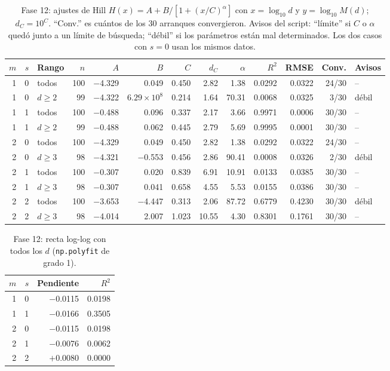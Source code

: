\documentclass[11pt,letterpaper]{article}
\begin{document}
\begin{table}[H]
\centering
\footnotesize
\setlength{\tabcolsep}{3.5pt}
\caption{Fase 12: ajustes de Hill $H(x)=A+B/[1+(x/C)^\alpha]$ con $x=\log_{10}d$ y $y=\log_{10}M(d)$; $d_C=10^C$. ``Conv.'' es cuántos de los 30 arranques convergieron. Avisos del script: ``límite'' si $C$ o $\alpha$ quedó junto a un límite de búsqueda; ``débil'' si los parámetros están mal determinados. Los dos casos con $s=0$ usan los mismos datos.}\label{tab:f12hill}
\begin{adjustbox}{max width=\textwidth}
\begin{tabular}{rrlrrrrrrrrrl}
\toprule
$m$ & $s$ & Rango & $n$ & $A$ & $B$ & $C$ & $d_C$ & $\alpha$ & $R^2$ & RMSE & Conv. & Avisos \\
\midrule
1 & 0 & todos & 100 & $-$4.329 & 0.049 & 0.450 & 2.82 & 1.38 & 0.0292 & 0.0322 & 24/30 & -- \\
1 & 0 & $d\ge2$ & 99 & $-$4.322 & $6.29\times10^{8}$ & 0.214 & 1.64 & 70.31 & 0.0068 & 0.0325 & 3/30 & débil \\
1 & 1 & todos & 100 & $-$0.488 & 0.096 & 0.337 & 2.17 & 3.66 & 0.9971 & 0.0006 & 30/30 & -- \\
1 & 1 & $d\ge2$ & 99 & $-$0.488 & 0.062 & 0.445 & 2.79 & 5.69 & 0.9995 & 0.0001 & 30/30 & -- \\
2 & 0 & todos & 100 & $-$4.329 & 0.049 & 0.450 & 2.82 & 1.38 & 0.0292 & 0.0322 & 24/30 & -- \\
2 & 0 & $d\ge3$ & 98 & $-$4.321 & $-$0.553 & 0.456 & 2.86 & 90.41 & 0.0008 & 0.0326 & 2/30 & débil \\
2 & 1 & todos & 100 & $-$0.307 & 0.020 & 0.839 & 6.91 & 10.91 & 0.0133 & 0.0385 & 30/30 & -- \\
2 & 1 & $d\ge3$ & 98 & $-$0.307 & 0.041 & 0.658 & 4.55 & 5.53 & 0.0155 & 0.0386 & 30/30 & -- \\
2 & 2 & todos & 100 & $-$3.653 & $-$4.447 & 0.313 & 2.06 & 87.72 & 0.6779 & 0.4230 & 30/30 & débil \\
2 & 2 & $d\ge3$ & 98 & $-$4.014 & 2.007 & 1.023 & 10.55 & 4.30 & 0.8301 & 0.1761 & 30/30 & -- \\
\bottomrule
\end{tabular}
\end{adjustbox}
\end{table}
\begin{table}[H]
\centering
\small
\setlength{\tabcolsep}{3.5pt}
\caption{Fase 12: recta log-log con todos los $d$ (\texttt{np.polyfit} de grado 1).}\label{tab:f12recta}
\begin{adjustbox}{max width=\textwidth}
\begin{tabular}{rrrr}
\toprule
$m$ & $s$ & Pendiente & $R^2$ \\
\midrule
1 & 0 & $-$0.0115 & 0.0198 \\
1 & 1 & $-$0.0166 & 0.3505 \\
2 & 0 & $-$0.0115 & 0.0198 \\
2 & 1 & $-$0.0076 & 0.0062 \\
2 & 2 & $+$0.0080 & 0.0000 \\
\bottomrule
\end{tabular}
\end{adjustbox}
\end{table}
\end{document}
